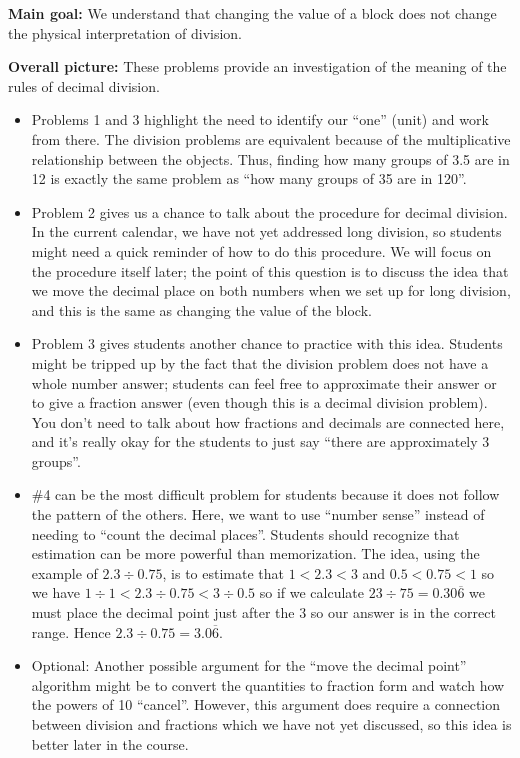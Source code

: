 \documentclass[nooutcomes,noauthor,handout]{ximera}
\begin{document}
\newpage
\begin{instructorNotes}

{\bf Main goal:} We understand that changing the value of a block does not change the physical interpretation of division.

{\bf Overall picture:}
These problems provide an investigation of the meaning of the rules of decimal division.

\begin{itemize}
	\item Problems 1 and 3 highlight the need to identify our ``one'' (unit) and work from there.  The division problems are equivalent because of the multiplicative relationship between the objects.  Thus, finding how many groups of 3.5 are in 12 is exactly the same problem as ``how many groups of 35 are in 120''.
	\item Problem 2 gives us a chance to talk about the procedure for decimal division. In the current calendar, we have not yet addressed long division, so students might need a quick reminder of how to do this procedure. We will focus on the procedure itself later; the point of this question is to discuss the idea that we move the decimal place on both numbers when we set up for long division, and this is the same as changing the value of the block.
	\item Problem 3 gives students another chance to practice with this idea. Students might be tripped up by the fact that the division problem does not have a whole number answer; students can feel free to approximate their answer or to give a fraction answer (even though this is a decimal division problem). You don't need to talk about how fractions and decimals are connected here, and it's really okay for the students to just say ``there are approximately 3 groups''.
	\item \#4 can be the most difficult problem for students because it does not follow the pattern of the others. Here, we want to use ``number sense'' instead of needing to ``count the decimal places''. Students should recognize that estimation can be more powerful than memorization. The idea, using the example of $2.3 \div 0.75$, is to estimate that $1 < 2.3 < 3$ and $0.5 < 0.75 < 1$ so we have $1 \div 1 < 2.3 \div 0.75 < 3 \div 0.5$ so if we calculate $23 \div 75 = 0.30\overline{6}$ we must place the decimal point just after the $3$ so our answer is in the correct range. Hence $2.3 \div 0.75 = 3.0\overline{6}$.
	\item Optional: Another possible argument for the ``move the decimal point'' algorithm might be to convert the quantities to fraction form and watch how the powers of 10 ``cancel''. However, this argument does require a connection between division and fractions which we have not yet discussed, so this idea is better later in the course.
\end{itemize}


\end{instructorNotes}
\end{document}
